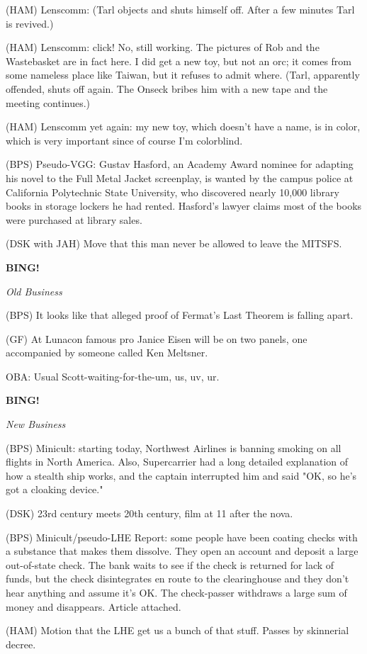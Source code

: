 \documentclass[12pt]{article}
\newcommand{\bing}{{\bf BING!} }
\newcommand{\goto}[1]{\bing \vskip 12pt \centerline{{\em{#1}}}}
\begin{document}
(HAM) Lenscomm: (Tarl objects and shuts himself off. After a few minutes Tarl is revived.)

(HAM) Lenscomm: click! No, still working. The pictures of Rob and the Wastebasket are in fact here. I did get a new toy, but not an orc; it comes from some nameless place like Taiwan, but it refuses to admit where. (Tarl, apparently offended, shuts off again. The Onseck bribes him with a new tape and the meeting continues.)

(HAM) Lenscomm yet again: my new toy, which doesn't have a name, is in color, which is very important since of course I'm colorblind.

(BPS) Pseudo-VGG: Gustav Hasford, an Academy Award nominee for adapting his novel to the Full Metal Jacket screenplay, is wanted by the campus police at California Polytechnic State University, who discovered nearly 10,000 library books in storage lockers he had rented. Hasford's lawyer claims most of the books were purchased at library sales.

(DSK with JAH) Move that this man never be allowed to leave the MITSFS.

\goto{Old Business}

(BPS) It looks like that alleged proof of Fermat's Last Theorem is falling apart.

(GF) At Lunacon famous pro Janice Eisen will be on two panels, one accompanied by someone called Ken Meltsner.

OBA: Usual Scott-waiting-for-the-um, us, uv, ur.

\goto{New Business}

(BPS) Minicult: starting today, Northwest Airlines is banning smoking on all flights in North America. Also, Supercarrier had a long detailed explanation of how a stealth ship works, and the captain interrupted him and said "OK, so he's got a cloaking device."

(DSK) 23rd century meets 20th century, film at 11 after the nova.

(BPS) Minicult/pseudo-LHE Report: some people have been coating checks with a substance that makes them dissolve. They open an account and deposit a large out-of-state check. The bank waits to see if the check is returned for lack of funds, but the check disintegrates en route to the clearinghouse and they don't hear anything and assume it's OK. The check-passer withdraws a large sum of money and disappears. Article attached.

(HAM) Motion that the LHE get us a bunch of that stuff. Passes by skinnerial decree.
\end{document}
